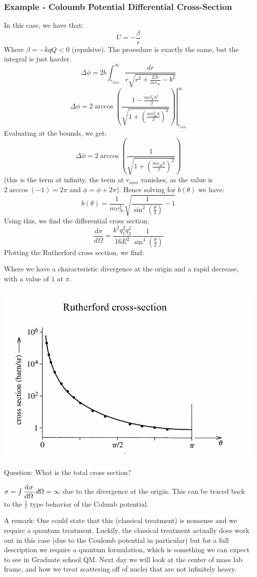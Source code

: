 \documentclass[../PHYS306Notes.tex]{subfiles}
\begin{document}
\subsubsection{Example - Coloumb Potential Differential Cross-Section}
In this case, we have that:
\[U = -\frac{\beta}{r}\]
Where $\beta = -kqQ < 0$ (repulsive). The procedure is exactly the same, but the integral is just harder. 
\[\Delta \phi = 2b\int_{r_{min}}^\infty \frac{dr}{r\sqrt{r^2 + \frac{2\beta r}{mv_{\infty}} - b^2}}\]
\[\Delta \phi = \left.2\arccos(\frac{1 - \frac{mv_\infty^2 b^2}{\beta}}{\sqrt{1 + \left(\frac{mv_{\infty}^2b}{\beta}\right)^2}})\right|_{r_{min}}^{\infty}\]
Evaluating at the bounds, we get:
\[\Delta \phi = 2\arccos(\frac{1}{\sqrt{1 + \left(\frac{mv_\infty b}{\beta}\right)^2}})\]
(this is the term at infinity, the term at $r_{min}$ vanishes, as the value is $2\arccos(-1) = 2\pi$ and $\phi = \phi + 2\pi$). Hence solving for $b(\theta)$ we have:
\[b(\theta) = \frac{1}{mv_{\infty}^2}\sqrt{\frac{1}{\sin^2(\frac{\theta}{2})} - 1}\]
Using this, we find the differential cross section:
\[\frac{d\sigma}{d\Omega} = \frac{k^2q_1^2q_2^2}{16E^2}\frac{1}{\sin^4(\frac{\theta}{2})}\]
Plotting the Rutherford cross section, we find:

Where we have a characteristic divergence at the origin and a rapid decrease, with a value of $1$ at $\pi$. 
\begin{center}
    \includegraphics[scale=0.5]{Lecture-28/l28-img3.png}
\end{center}
Question: What is the total cross section?
\begin{s}
$\sigma = \int\dod{\sigma}{\Omega}d\Omega = \infty$ due to the divergence at the origin. This can be traced back to the $\frac{1}{r}$ type behavior of the Columb potential. 
\end{s}
A remark: One could state that this (classical treatment) is nonsense and we require a quantum treatment. Luckily, the classical treatment actually does work out in this case (due to the Coulomb potential in particular) but for a full description we require a quantum formulation, which is something we can expect to see in Graduate school QM. Next day we will look at the center of mass lab frame, and how we treat scattering off of nuclei that are not infinitely heavy. 
\end{document}
